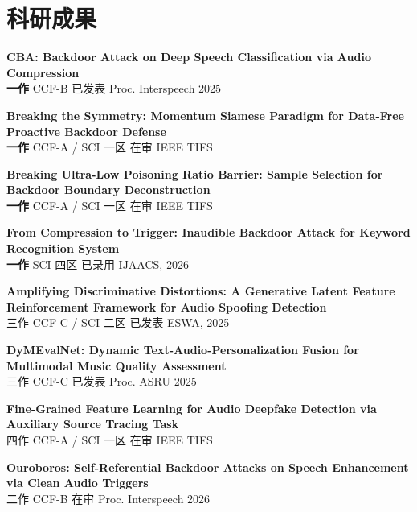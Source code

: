 \documentclass[a4paper,10pt]{article}
\begin{document}
\section{科研成果}
\begin{enumerate}[leftmargin=*, after=\strut, label={[\arabic*]}]

    \item \textbf{CBA: Backdoor Attack on Deep Speech Classification via Audio Compression}\\
    {\small \textbf{一作} \quad CCF-B \quad 已发表 \quad Proc. Interspeech 2025}

    \item \textbf{Breaking the Symmetry: Momentum Siamese Paradigm for Data-Free Proactive Backdoor Defense}\\
    {\small \textbf{一作} \quad CCF-A / SCI 一区 \quad 在审 \quad IEEE TIFS}

    \item \textbf{Breaking Ultra-Low Poisoning Ratio Barrier: Sample Selection for Backdoor Boundary Deconstruction}\\
    {\small \textbf{一作} \quad CCF-A / SCI 一区 \quad 在审 \quad IEEE TIFS}

    \item \textbf{From Compression to Trigger: Inaudible Backdoor Attack for Keyword Recognition System}\\
    {\small \textbf{一作} \quad SCI 四区 \quad 已录用 \quad IJAACS, 2026}

    \item \textbf{Amplifying Discriminative Distortions: A Generative Latent Feature Reinforcement Framework for Audio Spoofing Detection}\\
    {\small 三作 \quad CCF-C / SCI 二区 \quad 已发表 \quad ESWA, 2025}

    \item \textbf{DyMEvalNet: Dynamic Text-Audio-Personalization Fusion for Multimodal Music Quality Assessment}\\
    {\small 三作 \quad CCF-C \quad 已发表 \quad Proc. ASRU 2025}

    \item \textbf{Fine-Grained Feature Learning for Audio Deepfake Detection via Auxiliary Source Tracing Task}\\
    {\small 四作 \quad CCF-A / SCI 一区 \quad 在审 \quad IEEE TIFS}

    \item \textbf{Ouroboros: Self-Referential Backdoor Attacks on Speech Enhancement via Clean Audio Triggers}\\
    {\small 二作 \quad CCF-B \quad 在审 \quad Proc. Interspeech 2026}


\end{enumerate}
\end{document}
